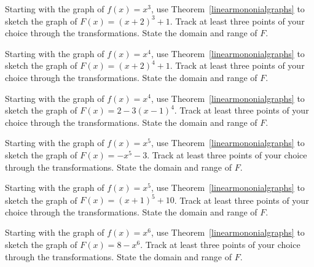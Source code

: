 \documentclass{ximera}
\begin{document}
	\author{Stitz-Zeager}


\begin{problem}\label{polytransfirst}
     Starting with the graph of $f(x) = x^3$, use Theorem~\ref{linearmononialgraphs} to sketch the graph of $F(x) = (x + 2)^{3} + 1$. Track at least three points of your choice through the transformations. State the domain and range of $F$.

\end{problem}

\begin{problem}
     Starting with the graph of $f(x) = x^4$, use Theorem~\ref{linearmononialgraphs} to sketch the graph of $F(x) = (x + 2)^{4} + 1$. Track at least three points of your choice through the transformations. State the domain and range of $F$.
\end{problem}

\begin{problem}
     Starting with the graph of $f(x) = x^4$, use Theorem~\ref{linearmononialgraphs} to sketch the graph of $F(x) = 2 - 3(x - 1)^{4}$. Track at least three points of your choice through the transformations. State the domain and range of $F$.
\end{problem}

\begin{problem}
     Starting with the graph of $f(x) = x^5$, use Theorem~\ref{linearmononialgraphs} to sketch the graph of $F(x) = -x^5 - 3$. Track at least three points of your choice through the transformations. State the domain and range of $F$.
\end{problem}

\begin{problem}
     Starting with the graph of $f(x) = x^5$, use Theorem~\ref{linearmononialgraphs} to sketch the graph of $F(x) = (x + 1)^{5} + 10$. Track at least three points of your choice through the transformations. State the domain and range of $F$.
\end{problem}

\begin{problem}\label{polytranslast}
     Starting with the graph of $f(x) = x^6$, use Theorem~\ref{linearmononialgraphs} to sketch the graph of $F(x) = 8 - x^6$. Track at least three points of your choice through the transformations. State the domain and range of $F$.
\end{problem}
\end{document}
